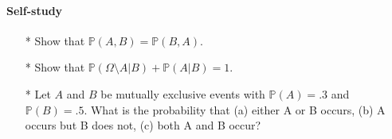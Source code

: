 \documentclass{article}
\begin{document}
\paragraph{Self-study}
\begin{enumerate}
\item[*] Show that $\mathbb{P}(A,B) = \mathbb{P}(B,A)$.
\item[*] Show that $\mathbb{P}(\Omega \setminus A|B) + \mathbb{P}(A|B) = 1$.
\item[*] Let $A$ and $B$ be mutually exclusive events with $\mathbb{P}(A) = .3$ and $\mathbb{P}(B) = .5$. What is the probability that (a) either A or B occurs, (b) A occurs but B does not, (c) both A and B occur?
\end{enumerate}
\end{document}
